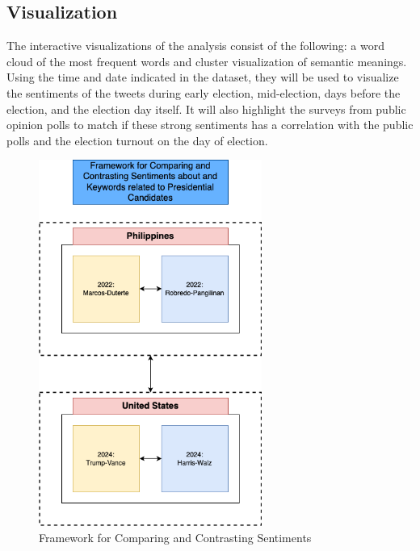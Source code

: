 \subsection{Visualization}
The interactive visualizations of the analysis consist of the following: a word cloud of the most frequent words and cluster visualization of semantic meanings. Using the time and date indicated in the dataset, they will be used to visualize the sentiments of the tweets during early election, mid-election, days before the election, and the election day itself. It will also highlight the surveys from public opinion polls to match if these strong sentiments has a correlation with the public polls and the election turnout on the day of election.
\begin{figure}[h]
    \centering
    \includegraphics[width=0.65\textwidth]{Figures/methodology_framework-for-comparing.png}
    \caption{Framework for Comparing and Contrasting Sentiments}
    \label{fig:Framework-for-sentiments}
\end{figure}